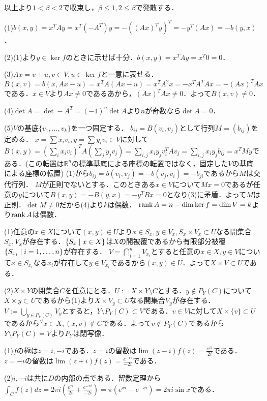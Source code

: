 \documentclass[
		book,
		head_space=20mm,
		foot_space=20mm,
		gutter=10mm,
		line_length=190mm
]{jlreq}
\begin{document}
以上より$1<\beta<2$で収束し，$\beta\le1, 2\le\beta$で発散する．

(1)$b(x,y)=x^T Ay=x^T(-A^T)y=-((Ax)^Ty)^T=-y^T(Ax)=-b(y,x)$．

(2)(1)より$y \in \ker f$のときに示せば十分．$b(x,y)=x^TAy=x^T0=0$．

(3)$Ax=v+u,v\in V,u\in \ker f$と一意に表せる．
$B(x,v)=b(x,Ax-u)=x^TA(Ax-u)=x^TA^2x=-x^TA^TAx=-(Ax)^TAx$である．$x \in V$より$Ax \neq 0$であるあから，$(Ax)^TAx\neq 0$．よって$B(x,v)\neq 0$．

(4)$\det A=\det -A^T=(-1)^n\det A$より$n$が奇数なら$\det A=0$．

(5)$V$の基底$\{v_1,\dots,v_k\}$を一つ固定する．
$b_{ij}=B(v_i,v_j)$として行列$M=(b_{ij})$を定める．
$x=\sum x_iv_i,y=\sum y_iv_i \in V$に対して
$B(x,y)=(\sum_i x_iv_i)^TA(\sum_j y_jv_j)=\sum_{i,j}x_iy_j v_i^TA v_j=\sum_{i,j}x_iy_j b_{ij}=x^TMy$である．(この転置は$\mathbb{R}^n$の標準基底による座標の転置ではなく，固定した$V$の基底による座標の転置)
(1)から$b_{ij}=b(v_i,v_j)=-b(v_j,v_i)=-b_{ji}$であるから$M$は交代行列．
$M$が正則でないとする．このときある$x\in V$について$Mx=0$であるが任意の$y$について$B(x,y)=-B(y,x)=-y^TBx=0$となり(3)に矛盾．よって$M$は正則．$\det M\neq 0$だから(4)より$k$は偶数．
$\rank A=n-\dim \ker f=\dim V=k$より$\rank A$は偶数．

(1)任意の$x \in X$について$(x,y)\in U$より$x \in S_x,y \in V_x,S_x \times V_x \subset U$なる開集合$S_x,V_x$が存在する．$\left\{ S_x\mathrel{}\middle|\mathrel{} x\in X\right\}$は$X$の開被覆であるから有限部分被覆$\left\{ S_{x_i}\mathrel{}\middle|\mathrel{} i=1,\dots,n\right\}$が存在する．
$V=\bigcap_{i=1}^n V_{x_i}$とすると任意の$x\in X,y\in V$について$x \in S_{x_i}$なる$x_i$が存在して$y \in V_{x_i}$であるから$(x,y)\in U$．よって$X \times V \subset U$である．

(2)$X \times Y$の閉集合$C$を任意にとる．$U:= X\times Y \setminus C$とする．$ y\notin P_Y(C)$について$X\times {y}\subset U$であるから(1)より$X \times V_y \subset U$なる開集合$V_y$が存在する．
$V:=\bigcup\limits_{y \in P_Y(C)} V_y$とすると，$Y\setminus P_Y(C)\subset V$である．$v \in V$に対して$X \times \{v\} \subset U$であるから$^\forall x \in X,(x,v)\notin C$である．よって$v \notin P_Y(C)$であるから$Y \setminus P_Y(C) =V$より$P_Y$は閉写像．

(1)$f$の極は$z=i,-i$である．$z=i$の留数は$\lim (z-i)f(z)=\frac{e^{xi}}{2i}$である．$z=-i$の留数は$\lim (z+i)f(z)=\frac{e^{-xi}}{-2i}$である．

(2)$i,-i$は共に$D$の内部の点である．留数定理から$\int_Cf(z)dz=2\pi i(\frac{e^{xi}}{2i}+\frac{e^{-xi}}{-2i})=\pi(e^{xi}-e^{-xi})=2\pi i\sin x$である．
\end{document}
